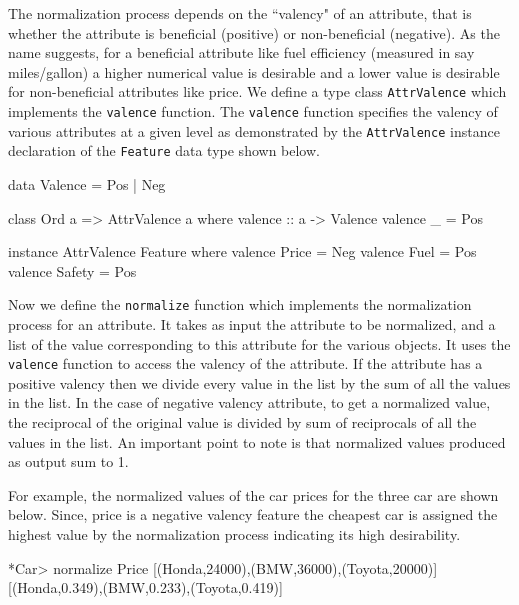 \documentclass{jfp}
\newcommand{\prog}[1]{\texttt{#1}}
\begin{document}
The normalization process depends on the ``valency" of an attribute, that is whether the attribute is beneficial (positive) or non-beneficial (negative). As the name suggests, for a beneficial attribute like fuel efficiency (measured in say miles/gallon) a higher numerical value is desirable and a lower value is desirable for non-beneficial attributes like price. We define a type class \prog{AttrValence} which implements the \prog{valence} function. The \prog{valence} function specifies the valency of various attributes at a given level as demonstrated by the \prog{AttrValence} instance declaration of the \prog{Feature} data type shown below. 
\begin{haskellcode}
data Valence = Pos | Neg

class Ord a => AttrValence a where
   valence :: a -> Valence
   valence _ = Pos

instance AttrValence Feature where
   valence Price  = Neg
   valence Fuel   = Pos
   valence Safety = Pos
\end{haskellcode}
Now we define the \prog{normalize} function which implements the normalization process for an attribute. It takes as input the attribute to be normalized, and a list of the value corresponding to this attribute for the various objects. It uses the \prog{valence} function to access the valency of the attribute. If the attribute has a positive valency then we divide every value in the list by the sum of all the values in the list. In the case of negative valency attribute, to get a normalized value, the reciprocal of the original value is divided by sum of reciprocals of all the values in the list. An important point to note is that normalized values produced as output sum to 1. 
For example, the normalized values of the car prices for the three car are shown below. Since, price is a negative valency feature the cheapest car is assigned the highest value by the normalization process indicating its high desirability.
\begin{haskellcode}
*Car> normalize Price [(Honda,24000),(BMW,36000),(Toyota,20000)]
[(Honda,0.349),(BMW,0.233),(Toyota,0.419)]
\end{haskellcode}
\end{document}
